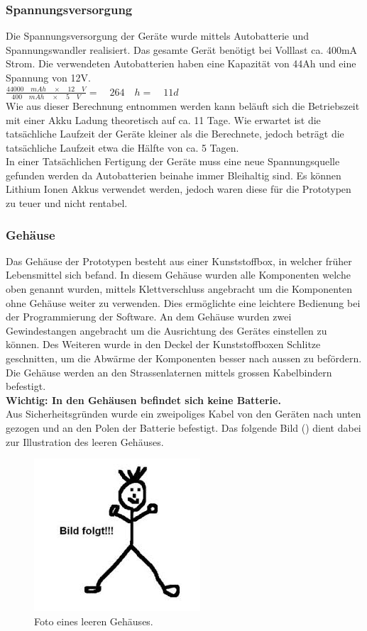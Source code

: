 \subsubsection{Spannungsversorgung}
Die Spannungsversorgung der Geräte wurde mittels Autobatterie und Spannungswandler realisiert. Das gesamte Gerät benötigt bei Volllast ca. 400mA Strom. Die verwendeten Autobatterien haben eine Kapazität von 44Ah und eine Spannung von 12V. \\

$\frac { 44000\quad mAh\quad \times \quad 12\quad V }{ 400\quad mAh\quad \times \quad 5\quad V } =\quad 264\quad h=\quad 11 d$ \\

Wie aus dieser Berechnung entnommen werden kann beläuft sich die Betriebszeit mit einer Akku Ladung theoretisch auf ca. 11 Tage. Wie erwartet ist die tatsächliche Laufzeit der Geräte kleiner als die Berechnete, jedoch beträgt die tatsächliche Laufzeit etwa die Hälfte von ca. 5 Tagen. \\
In einer Tatsächlichen Fertigung der Geräte muss eine neue Spannungsquelle gefunden werden da Autobatterien beinahe immer Bleihaltig sind. Es können Lithium Ionen Akkus verwendet werden, jedoch waren diese für die Prototypen zu teuer und nicht rentabel. 

\subsubsection{Gehäuse}
Das Gehäuse der Prototypen besteht aus einer Kunststoffbox, in welcher früher Lebensmittel sich befand. In diesem Gehäuse wurden alle Komponenten welche oben genannt wurden, mittels Klettverschluss angebracht um die Komponenten ohne Gehäuse weiter zu verwenden. Dies ermöglichte eine leichtere Bedienung bei der Programmierung der Software. An dem Gehäuse wurden zwei Gewindestangen angebracht um die Ausrichtung des Gerätes einstellen zu können. Des Weiteren wurde in den Deckel der Kunststoffboxen Schlitze geschnitten, um die Abwärme der Komponenten besser nach aussen zu befördern. Die Gehäuse werden an den Strassenlaternen mittels grossen Kabelbindern befestigt.\\
\textbf{Wichtig: In den Gehäusen befindet sich keine Batterie.}\\
Aus Sicherheitsgründen wurde ein zweipoliges Kabel von den Geräten nach unten gezogen und an den Polen der Batterie befestigt. Das folgende Bild () dient dabei zur Illustration des leeren Gehäuses.

\begin{figure}[H]
  \centering
  \includegraphics[height=0.49\textwidth]{Hardware/Gehaeuse.jpg} 
  \caption{Foto eines leeren Gehäuses.}
  \label{bGehäuse}
\end{figure}